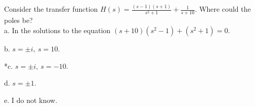 
Consider the transfer function \(H\left( s \right) = \frac{\left( s - 1 \right)\left( s + 1 \right)}{s^{2} + 1} + \frac{1}{s + 10}\). Where could the poles be? \\

a. In the solutions to the equation
\(\left( s + 10 \right)\left( s^{2} - 1 \right) + \left( s^{2} + 1 \right) = 0\).

b. \(s = \pm i,\ s = 10\).

*c. \(s = \pm i,\ s = - 10\).

d. \(s = \pm 1\).

e. I do not know. \\
